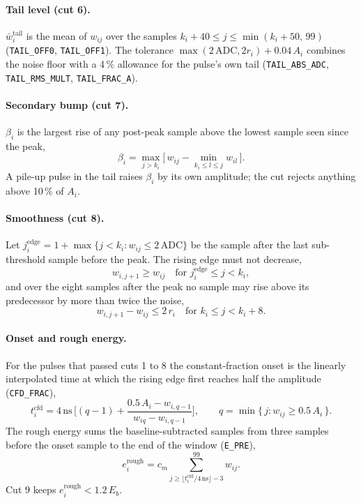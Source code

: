 \documentclass[11pt]{article}
\newcommand{\ns}{\,\mathrm{ns}}
\newcommand{\adc}{\,\mathrm{ADC}}
\newcommand{\code}[1]{\texttt{#1}}
\begin{document}
\paragraph{Tail level (cut 6).} $\bar w^{\mathrm{tail}}_i$ is the mean of $w_{ij}$ over the samples $k_i + 40 \le j \le \min(k_i + 50,\, 99)$ (\code{TAIL\_OFF0}, \code{TAIL\_OFF1}). The tolerance $\max(2\adc, 2r_i) + 0.04\,A_i$ combines the noise floor with a 4\,\% allowance for the pulse's own tail (\code{TAIL\_ABS\_ADC}, \code{TAIL\_RMS\_MULT}, \code{TAIL\_FRAC\_A}).

\paragraph{Secondary bump (cut 7).} $\beta_i$ is the largest rise of any post-peak sample above the lowest sample seen since the peak,
\begin{equation}
\beta_i = \max_{j > k_i}\Big[\, w_{ij} - \min_{k_i \le l \le j} w_{il} \,\Big].
\end{equation}
A pile-up pulse in the tail raises $\beta_i$ by its own amplitude; the cut rejects anything above 10\,\% of $A_i$.

\paragraph{Smoothness (cut 8).} Let $j^{\mathrm{edge}}_i = 1 + \max\{ j < k_i : w_{ij} \le 2\adc \}$ be the sample after the last sub-threshold sample before the peak. The rising edge must not decrease,
\begin{equation}
w_{i,j+1} \ge w_{ij} \quad \text{for } j^{\mathrm{edge}}_i \le j < k_i,
\end{equation}
and over the eight samples after the peak no sample may rise above its predecessor by more than twice the noise,
\begin{equation}
w_{i,j+1} - w_{ij} \le 2\,r_i \quad \text{for } k_i \le j < k_i + 8 .
\end{equation}

\paragraph{Onset and rough energy.} For the pulses that passed cuts 1 to 8 the constant-fraction onset is the linearly interpolated time at which the rising edge first reaches half the amplitude (\code{CFD\_FRAC}),
\begin{equation}
t^{\mathrm{cfd}}_i = 4\ns\,\Big[(q-1) + \frac{0.5\,A_i - w_{i,q-1}}{w_{iq} - w_{i,q-1}}\Big],
\qquad q = \min\{\, j : w_{ij} \ge 0.5\,A_i \,\}.
\label{eq:cfd}
\end{equation}
The rough energy sums the baseline-subtracted samples from three samples before the onset sample to the end of the window (\code{E\_PRE}),
\begin{equation}
e^{\mathrm{rough}}_i = c_m \sum_{j \ge \lfloor t^{\mathrm{cfd}}_i / 4\ns \rfloor - 3}^{99} w_{ij}.
\label{eq:erough}
\end{equation}
Cut 9 keeps $e^{\mathrm{rough}}_i < 1.2\,E_b$.
\end{document}
